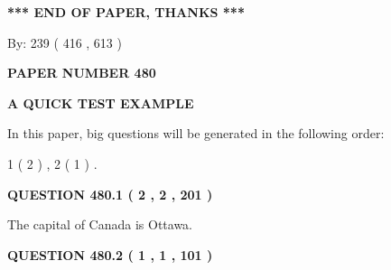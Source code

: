 \documentclass[12pt]{article}
\begin{document}
 
 
 
   
   
 \vspace{0.2in}
 
   
   
   
   
\vspace{1.0in} 
{\textbf{\large{ *** END OF PAPER, THANKS *** }}} 
   
   
\hspace{1.0in} By: 
 239 ( 416 ,  613 )
   
   
   
   
\newpage 
\setcounter{page}{ 
   480001 } 
   
   
   
   
 {\textbf{ \Large{ PAPER NUMBER  480  }}}
   
   
\vspace{0.2in}
   
   
   
   
   
   
 \vspace{0.2in}
{\LARGE {\textbf{ A QUICK TEST EXAMPLE}}}
   
   
   
\vspace{0.2in}
   
In this paper, big questions will be generated in the following order: 
   
   
   1 ( 2 )
 ,
   2 ( 1 )
 .
  
\vspace{0.2in}
  
{\textbf{\Large{QUESTION
480.1 
 ( 2 , 2 , 201 )
}}}
  
  
 
 
\noindent{}
 
 
The capital of Canada is Ottawa.
 
 
 
 
  
\vspace{0.2in}
  
{\textbf{\Large{QUESTION
480.2 
 ( 1 , 1 , 101 )
}}}
  
  
 
 
\noindent{}
\end{document}
